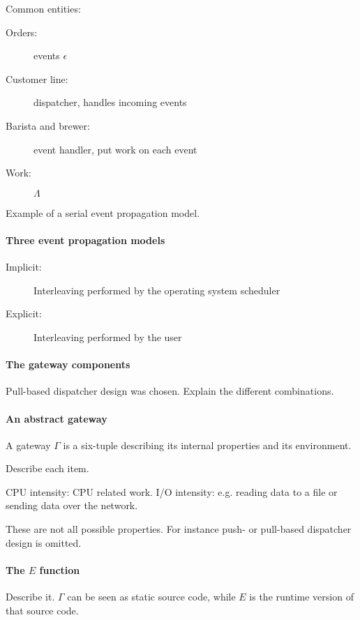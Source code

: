 \documentclass{memoir}
\begin{document}
Common entities:

\begin{description}
    \item[Orders:] events $\epsilon$
    \item[Customer line:] dispatcher, handles incoming events
    \item[Barista and brewer:] event handler, put work on each event
    \item[Work:] $\Lambda$
\end{description}

Example of a serial event propagation model.

\paragraph{Three event propagation models}

\begin{description}
    \item[Implicit:] Interleaving performed by the operating system scheduler
    \item[Explicit:] Interleaving performed by the user
\end{description}

\paragraph{The gateway components}

Pull-based dispatcher design was chosen. Explain the different combinations.

\paragraph{An abstract gateway}

A gateway $\Gamma$ is a six-tuple describing its internal properties and its
environment.

Describe each item.

CPU intensity: CPU related work. I/O intensity: e.g. reading data to a file or
sending data over the network.

These are not all possible properties. For instance push- or pull-based
dispatcher design is omitted.

\paragraph{The $E$ function}

Describe it. $\Gamma$ can be seen as static source code, while $E$ is the
runtime version of that source code.
\end{document}
